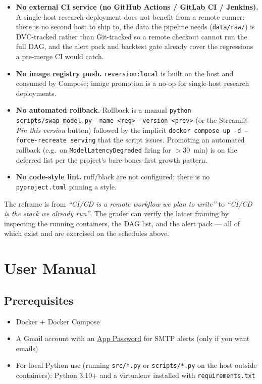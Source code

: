 \documentclass[11pt,a4paper]{article}
\begin{document}
\begin{itemize}[leftmargin=1.5em,itemsep=0pt]
  \item \textbf{No external CI service (no GitHub Actions / GitLab CI / Jenkins).} A single-host research deployment does not benefit from a remote runner: there is no second host to ship to, the data the pipeline needs (\texttt{data/raw/}) is DVC-tracked rather than Git-tracked so a remote checkout cannot run the full DAG, and the alert pack and backtest gate already cover the regressions a pre-merge CI would catch.
  \item \textbf{No image registry push.} \texttt{reversion:local} is built on the host and consumed by Compose; image promotion is a no-op for single-host research deployments.
  \item \textbf{No automated rollback.} Rollback is a manual \texttt{python scripts/swap\_model.py --name <reg> --version <prev>} (or the Streamlit \emph{Pin this version} button) followed by the implicit \texttt{docker compose up -d --force-recreate serving} that the script issues. Promoting an automated rollback (e.g.\ on \texttt{ModelLatencyDegraded} firing for $>$30~min) is on the deferred list per the project's bare-bones-first growth pattern.
  \item \textbf{No code-style lint.} ruff/black are not configured; there is no \texttt{pyproject.toml} pinning a style.
\end{itemize}



The reframe is from \emph{``CI/CD is a remote workflow we plan to write''} to \emph{``CI/CD is the stack we already run''}. The grader can verify the latter framing by inspecting the running containers, the DAG list, and the alert pack --- all of which exist and are exercised on the schedules above.

\newpage
\section{User Manual}\label{sec:user-manual}

\subsection{Prerequisites}
\begin{itemize}[leftmargin=1.5em,itemsep=0pt]
  \item Docker + Docker Compose
  \item A Gmail account with an \href{https://support.google.com/accounts/answer/185833}{App Password} for SMTP alerts (only if you want emails)
  \item For local Python use (running \texttt{src/*.py} or \texttt{scripts/*.py} on the host outside containers): Python 3.10+ and a virtualenv installed with \texttt{requirements.txt}
\end{itemize}
\end{document}
